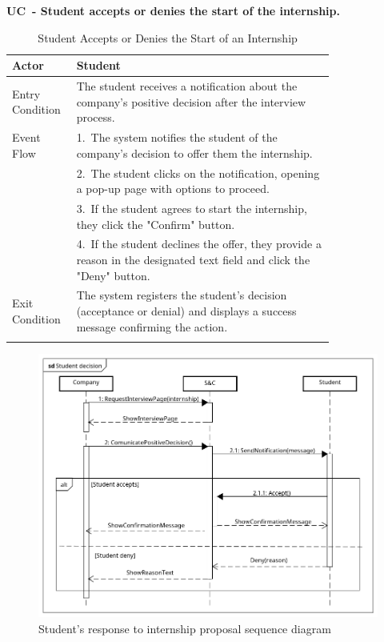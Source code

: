 \textbf{UC\cuc\  - Student accepts or denies the start of the internship.}

\begin{center} 
    \renewcommand{\arraystretch}{1.2} 
    \begin{longtable}{ l p{0.8\linewidth} } 
        \hline 
        Actor & Student \\ \hline 
        Entry Condition & The student receives a notification about the company's positive decision after the interview process. \\ \hline 
        Event Flow & 1.\ The system notifies the student of the company's decision to offer them the internship. \\ 
        & 2.\ The student clicks on the notification, opening a pop-up page with options to proceed. \\ 
        & 3.\ If the student agrees to start the internship, they click the "Confirm" button. \\ 
        & 4.\ If the student declines the offer, they provide a reason in the designated text field and click the "Deny" button. \\ \hline 
        Exit Condition & The system registers the student's decision (acceptance or denial) and displays a success message confirming the action. \\ \hline 
        \caption{Student Accepts or Denies the Start of an Internship} 
        \label{tab:student_internship_uc} 
    \end{longtable} 
\end{center}

\begin{figure}[H]
    \centering
    \includegraphics[width=1\linewidth]{Images/Sequence diagrams/Student decision.png}
    \caption{Student's response to internship proposal sequence diagram}
    \label{fig:enter-label}
\end{figure}

